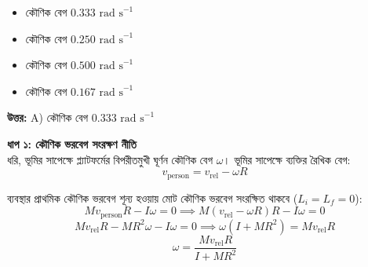 \documentclass[12pt, a4paper]{article}
\begin{document}
{{\begin{center}
\end{center}
\vspace{1em}

\begin{itemize}[label={}, leftmargin=1cm, itemsep=0.5em]
    \item[\textbf{A)}] কৌণিক বেগ $0.333\text{ rad s}^{-1}$
    \item[\textbf{B)}] কৌণিক বেগ $0.250\text{ rad s}^{-1}$
    \item[\textbf{C)}] কৌণিক বেগ $0.500\text{ rad s}^{-1}$
    \item[\textbf{D)}] কৌণিক বেগ $0.167\text{ rad s}^{-1}$
\end{itemize}

\vspace{0.5em}
\begin{tcolorbox}[answerbox]
    \textbf{\color{success} উত্তর:} A) কৌণিক বেগ $0.333\text{ rad s}^{-1}$
\end{tcolorbox}
\vspace{1em}

\begin{tcolorbox}[solutionbox={সমাধান (Solution)}]
    \noindent
    \textbf{ধাপ ১: কৌণিক ভরবেগ সংরক্ষণ নীতি} \\
    ধরি, ভূমির সাপেক্ষে প্ল্যাটফর্মের বিপরীতমুখী ঘূর্ণন কৌণিক বেগ $\omega$। ভূমির সাপেক্ষে ব্যক্তির রৈখিক বেগ:
    \[ v_{\text{person}} = v_{\text{rel}} - \omega R \]
    
    ব্যবস্থার প্রাথমিক কৌণিক ভরবেগ শূন্য হওয়ায় মোট কৌণিক ভরবেগ সংরক্ষিত থাকবে ($L_i = L_f = 0$):
    \[ M v_{\text{person}} R - I \omega = 0 \implies M (v_{\text{rel}} - \omega R) R - I \omega = 0 \]
    \[ M v_{\text{rel}} R - M R^2 \omega - I \omega = 0 \implies \omega (I + M R^2) = M v_{\text{rel}} R \]
    \[ \omega = \frac{M v_{\text{rel}} R}{I + M R^2} \]
    

\end{tcolorbox}}}
\end{document}
